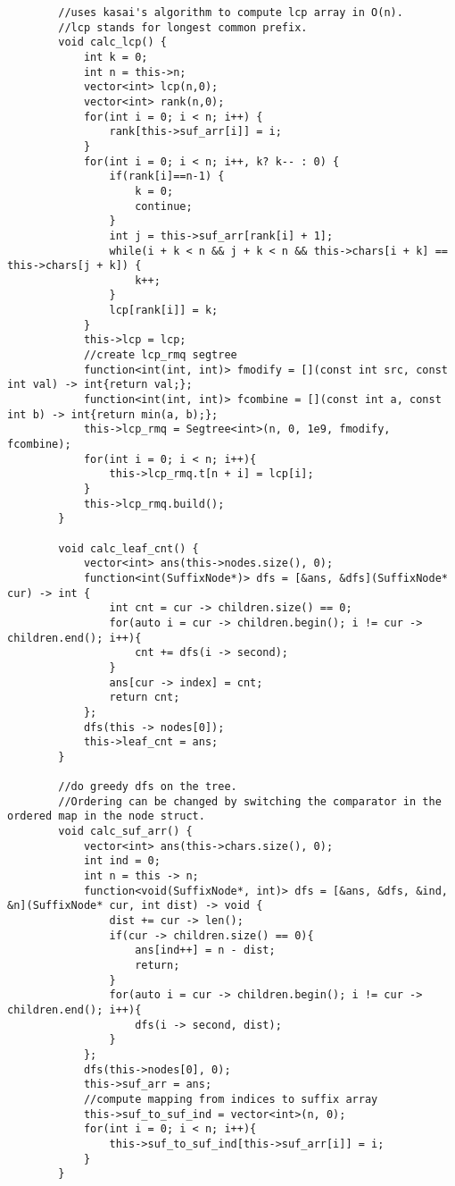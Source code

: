 \documentclass[8pt, headheight=10pt, a4paper]{article}
\begin{document}
\begin{multicols*}{3}
\begin{lstlisting}
        //uses kasai's algorithm to compute lcp array in O(n). 
        //lcp stands for longest common prefix.
        void calc_lcp() {
            int k = 0;
            int n = this->n;
            vector<int> lcp(n,0);
            vector<int> rank(n,0);
            for(int i = 0; i < n; i++) {
                rank[this->suf_arr[i]] = i;
            }
            for(int i = 0; i < n; i++, k? k-- : 0) {
                if(rank[i]==n-1) {
                    k = 0; 
                    continue;
                }
                int j = this->suf_arr[rank[i] + 1];
                while(i + k < n && j + k < n && this->chars[i + k] == this->chars[j + k]) {
                    k++;
                }
                lcp[rank[i]] = k;
            }
            this->lcp = lcp;
            //create lcp_rmq segtree
            function<int(int, int)> fmodify = [](const int src, const int val) -> int{return val;};
            function<int(int, int)> fcombine = [](const int a, const int b) -> int{return min(a, b);};
            this->lcp_rmq = Segtree<int>(n, 0, 1e9, fmodify, fcombine);
            for(int i = 0; i < n; i++){
                this->lcp_rmq.t[n + i] = lcp[i];
            }
            this->lcp_rmq.build();
        }

        void calc_leaf_cnt() {
            vector<int> ans(this->nodes.size(), 0);
            function<int(SuffixNode*)> dfs = [&ans, &dfs](SuffixNode* cur) -> int {
                int cnt = cur -> children.size() == 0;
                for(auto i = cur -> children.begin(); i != cur -> children.end(); i++){
                    cnt += dfs(i -> second);
                }
                ans[cur -> index] = cnt;
                return cnt;
            };
            dfs(this -> nodes[0]);
            this->leaf_cnt = ans;
        }

        //do greedy dfs on the tree. 
        //Ordering can be changed by switching the comparator in the ordered map in the node struct. 
        void calc_suf_arr() {
            vector<int> ans(this->chars.size(), 0);
            int ind = 0;
            int n = this -> n;
            function<void(SuffixNode*, int)> dfs = [&ans, &dfs, &ind, &n](SuffixNode* cur, int dist) -> void {
                dist += cur -> len();
                if(cur -> children.size() == 0){
                    ans[ind++] = n - dist;
                    return;
                }
                for(auto i = cur -> children.begin(); i != cur -> children.end(); i++){
                    dfs(i -> second, dist);
                }
            };
            dfs(this->nodes[0], 0);
            this->suf_arr = ans;
            //compute mapping from indices to suffix array
            this->suf_to_suf_ind = vector<int>(n, 0);
            for(int i = 0; i < n; i++){
                this->suf_to_suf_ind[this->suf_arr[i]] = i;
            }
        }


\end{lstlisting}
\end{multicols*}
\end{document}
